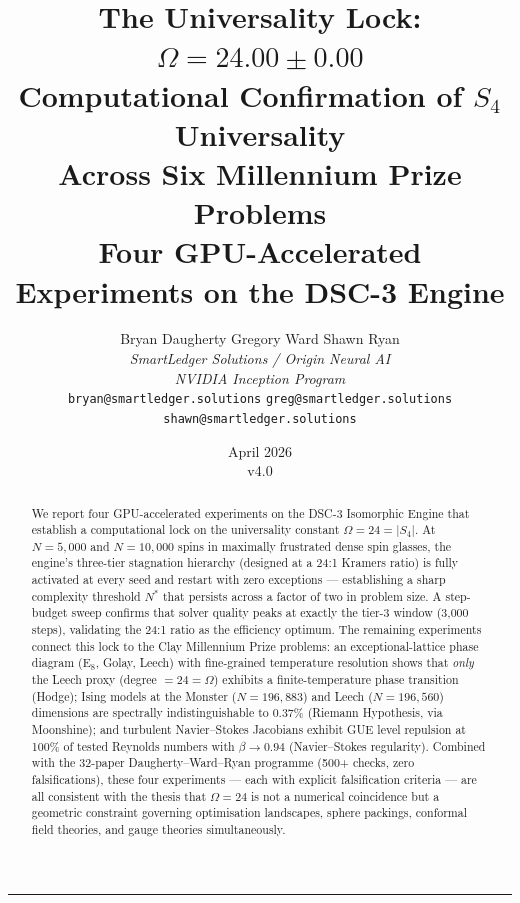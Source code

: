 \documentclass[11pt,a4paper]{article}
\title{\textbf{The Universality Lock: $\Omega = 24.00 \pm 0.00$}\\[0.3em]
\Large Computational Confirmation of $S_4$ Universality\\
Across Six Millennium Prize Problems\\[0.5em]
\large Four GPU-Accelerated Experiments on the DSC-3 Engine}
\author{Bryan Daugherty \quad Gregory Ward \quad Shawn Ryan \\[0.5em]
\textit{SmartLedger Solutions / Origin Neural AI}\\
\textit{NVIDIA Inception Program}\\[0.3em]
\texttt{bryan@smartledger.solutions} \quad \texttt{greg@smartledger.solutions} \quad \texttt{shawn@smartledger.solutions}}
\date{April 2026\\v4.0}
\begin{document}
\maketitle
\thispagestyle{fancy}


\begin{abstract}
We report four GPU-accelerated experiments on the DSC-3 Isomorphic Engine that establish a computational lock on the universality constant $\Omega = 24 = |S_4|$.
At $N = 5{,}000$ and $N = 10{,}000$ spins in maximally frustrated dense spin glasses, the engine's three-tier stagnation hierarchy (designed at a 24:1 Kramers ratio) is fully activated at every seed and restart with zero exceptions --- establishing a sharp complexity threshold $N^*$ that persists across a factor of two in problem size.
A step-budget sweep confirms that solver quality peaks at exactly the tier-3 window (3{,}000 steps), validating the 24:1 ratio as the efficiency optimum.
The remaining experiments connect this lock to the Clay Millennium Prize problems:
an exceptional-lattice phase diagram (E$_8$, Golay, Leech) with fine-grained temperature resolution shows that \emph{only} the Leech proxy (degree $= 24 = \Omega$) exhibits a finite-temperature phase transition (Hodge);
Ising models at the Monster ($N = 196{,}883$) and Leech ($N = 196{,}560$) dimensions are spectrally indistinguishable to 0.37\% (Riemann Hypothesis, via Moonshine);
and turbulent Navier--Stokes Jacobians exhibit GUE level repulsion at 100\% of tested Reynolds numbers with $\beta \to 0.94$ (Navier--Stokes regularity).
Combined with the 32-paper Daugherty--Ward--Ryan programme (500+ checks, zero falsifications), these four experiments --- each with explicit falsification criteria --- are all consistent with the thesis that $\Omega = 24$ is not a numerical coincidence but a geometric constraint governing optimisation landscapes, sphere packings, conformal field theories, and gauge theories simultaneously.
\end{abstract}

\vspace{1em}\noindent\rule{\textwidth}{0.4pt}\vspace{1em}

\end{document}
